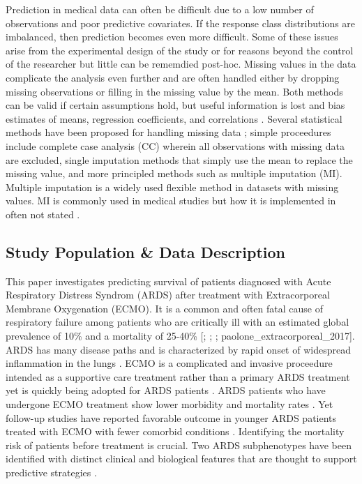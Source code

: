 \documentclass[12pt,]{article}
\begin{document}
Prediction in medical data can often be difficult due to a low number of
observations and poor predictive covariates. If the response class
distributions are imbalanced, then prediction becomes even more
difficult. Some of these issues arise from the experimental design of
the study or for reasons beyond the control of the researcher but little
can be rememdied post-hoc. Missing values in the data complicate the
analysis even further and are often handled either by dropping missing
observations or filling in the missing value by the mean. Both methods
can be valid if certain assumptions hold, but useful information is lost
and bias estimates of means, regression coefficients, and correlations
\autocites[pp.8]{van_buuren_flexible_2012}{schafer_missing_2002}.
Several statistical methods have been proposed for handling missing data
\autocite{schafer_missing_2002}; simple proceedures include complete
case analysis (CC) wherein all observations with missing data are
excluded, single imputation methods that simply use the mean to replace
the missing value, and more principled methods such as multiple
imputation (MI). Multiple imputation is a widely used flexible method in
datasets with missing values. MI is commonly used in medical studies
\autocites{powney_review_2014}{karahalios_review_2012}{wood_are_2004}
but how it is implemented in often not stated
\autocites{mackinnon_use_2010}{hayati_rezvan_rise_2015}.

\subsection{Study Population \& Data
Description}\label{study-population-data-description}

This paper investigates predicting survival of patients diagnosed with
Acute Respiratory Distress Syndrom (ARDS) after treatment with
Extracorporeal Membrane Oxygenation (ECMO). It is a common and often
fatal cause of respiratory failure among patients who are critically ill
with an estimated global prevalence of 10\% and a mortality of 25-40\%
{[}\textcite{bellani_epidemiology_2016};
\textcite{rubenfeld_epidemiology_2007}; \textcite{fan_acute_2018};
paolone\_extracorporeal\_2017{]}. ARDS has many disease paths and is
characterized by rapid onset of widespread inflammation in the lungs
\autocite{fan_acute_2018}. ECMO is a complicated and invasive proceedure
intended as a supportive care treatment rather than a primary ARDS
treatment yet is quickly being adopted for ARDS patients
\autocite{park_extracorporeal_2011}. ARDS patients who have undergone
ECMO treatment show lower morbidity and mortality rates
\autocite{wallace_ave_2010}. Yet follow-up studies have reported
favorable outcome in younger ARDS patients treated with ECMO with fewer
comorbid conditions \autocite{sahetya_survival_2018}. Identifying the
mortality risk of patients before treatment is crucial. Two ARDS
subphenotypes have been identified with distinct clinical and biological
features that are thought to support predictive strategies
\autocites{calfee_acute_2018}{sinha_latent_2018}.
\end{document}
